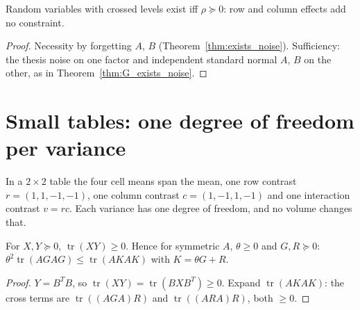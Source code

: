\begin{theorem}\label{thm:noiseX_exists}
  \leanok
  Random variables with crossed levels exist iff $\rho \succeq 0$: row and column effects add
  no constraint.
\end{theorem}
\begin{proof}
  \leanok
  Necessity by forgetting $A$, $B$ (Theorem~\ref{thm:exists_noise}). Sufficiency: the thesis
  noise on one factor and independent standard normal $A$, $B$ on the other, as in
  Theorem~\ref{thm:G_exists_noise}.
\end{proof}

\section{Small tables: one degree of freedom per variance}\label{sec:crossed_small}

In a $2\times 2$ table the four cell means span the mean, one row contrast $r = (1,1,-1,-1)$, one
column contrast $c = (1,-1,1,-1)$ and one interaction contrast $v = rc$. Each variance has one
degree of freedom, and no volume changes that.

\begin{lemma}\label{lem:small_trace_nonneg}
  \leanok
  For $X, Y \succeq 0$, $\operatorname{tr}(XY) \ge 0$. Hence for symmetric $A$, $\theta \ge 0$ and
  $G, R \succeq 0$: $\theta^2\operatorname{tr}(AGAG) \le \operatorname{tr}(AKAK)$ with $K = \theta G + R$.
\end{lemma}
\begin{proof}
  \leanok
  $Y = B^TB$, so $\operatorname{tr}(XY) = \operatorname{tr}(BXB^T) \ge 0$. Expand $\operatorname{tr}(AKAK)$:
  the cross terms are $\operatorname{tr}((AGA)R)$ and $\operatorname{tr}((ARA)R)$, both $\ge 0$.
\end{proof}


